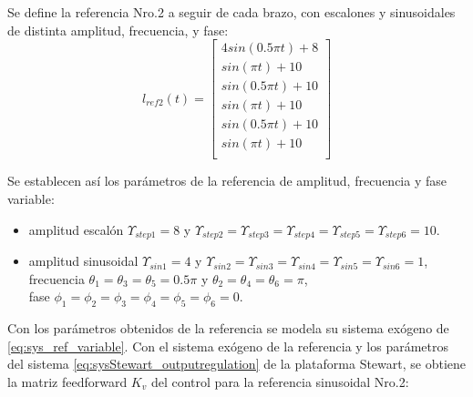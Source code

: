 Se define la referencia Nro.2 a seguir de cada brazo, con escalones y sinusoidales de distinta amplitud, frecuencia, y fase:
\begin{equation}
    l_{ref2}(t) = \begin{bmatrix}
        4 sin(0.5\pi t) + 8\\
        sin(\pi t) + 10\\
        sin(0.5\pi t) + 10\\
        sin(\pi t) + 10\\
        sin(0.5\pi t) + 10\\
        sin(\pi t) + 10\\
    \end{bmatrix}
\end{equation}

Se establecen así los parámetros de la referencia de amplitud, frecuencia y fase variable:
\begin{itemize}
    \item amplitud escalón $\Upsilon_{step1}=8$ y $\Upsilon_{step2}=\Upsilon_{step3}=\Upsilon_{step4}=\Upsilon_{step5}=\Upsilon_{step6}=10$.
    \item amplitud sinusoidal $\Upsilon_{sin1}=4$ y $\Upsilon_{sin2}=\Upsilon_{sin3}=\Upsilon_{sin4}=\Upsilon_{sin5}=\Upsilon_{sin6}=1$,\\ 
    frecuencia $\theta_1=\theta_3=\theta_5=0.5\pi$ y $\theta_2=\theta_4=\theta_6=\pi$, \\
    fase $\phi_1=\phi_2=\phi_3=\phi_4=\phi_5=\phi_6=0$.
\end{itemize}
 

Con los parámetros obtenidos de la referencia se modela su sistema exógeno de \ref{eq:sys_ref_variable}. Con el sistema exógeno de la referencia y los parámetros del sistema \ref{eq:sysStewart_outputregulation} de la plataforma Stewart, se obtiene la matriz feedforward $K_v$ del control para la referencia sinusoidal Nro.2:


